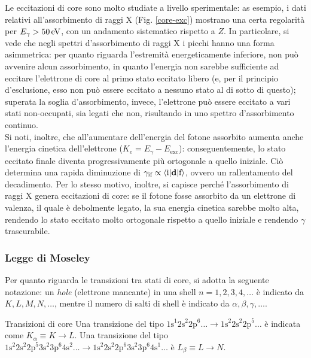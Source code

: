 Le eccitazioni di core sono molto studiate a livello sperimentale: as esempio, i dati relativi all'assorbimento di raggi X (Fig. \ref{core-exc}) mostrano una certa regolarità per $ E_\gamma > 50\,\mathrm{eV} $, con un andamento sistematico rispetto a $ Z $. In particolare, si vede che negli spettri d'assorbimento di raggi X i picchi hanno una forma asimmetrica: per quanto riguarda l'estremità energeticamente inferiore, non può avvenire alcun assorbimento, in quanto l'energia non sarebbe sufficiente ad eccitare l'elettrone di core al primo stato eccitato libero (e, per il principio d'esclusione, esso non può essere eccitato a nessuno stato al di sotto di questo); superata la soglia d'assorbimento, invece, l'elettrone può essere eccitato a vari stati non-occupati, sia legati che non, risultando in uno spettro d'assorbimento continuo. \\
Si noti, inoltre, che all'aumentare dell'energia del fotone assorbito aumenta anche l'energia cinetica dell'elettrone ($ K_e = E_\gamma - E_\text{exc} $): conseguentemente, lo stato eccitato finale diventa progressivamente più ortogonale a quello iniziale. Ciò determina una rapida diminuzione di $ \gamma_\text{if} \propto \braket{\text{i} | \mathbf{d} | \text{f}} $, ovvero un rallentamento del decadimento. Per lo stesso motivo, inoltre, si capisce perché l'assorbimento di raggi X genera eccitazioni di core: se il fotone fosse assorbito da un elettrone di valenza, il quale è debolmente legato, la sua energia cinetica sarebbe molto alta, rendendo lo stato eccitato molto ortogonale rispetto a quello iniziale e rendendo $ \gamma $ trascurabile.

\subsubsection{Legge di Moseley}

Per quanto riguarda le transizioni tra stati di core, si adotta la seguente notazione: un \textit{hole} (elettrone mancante) in una shell $ n = 1,2,3,4,\dots$ è indicato da $ K,L,M,N,\dots $, mentre il numero di salti di shell è indicato da $ \alpha,\beta,\gamma,\dots$.

\begin{example}{Transizioni di core}{}
	Una transizione del tipo $ \text{1s}^1 \text{2s}^2 \text{2p}^6 \dots \rightarrow \text{1s}^2 \text{2s}^2 \text{2p}^5 \dots $ è indicata come $ K_\alpha \equiv K \rightarrow L $. Una transizione del tipo $ \text{1s}^2 \text{2s}^2 \text{2p}^5 \text{3s}^2 \text{3p}^6 \text{4s}^2 \dots \rightarrow \text{1s}^2 \text{2s}^2 \text{2p}^6 \text{3s}^2 \text{3p}^6 \text{4s}^1 \dots $ è $ L_\beta \equiv L \rightarrow N $.
\end{example}

